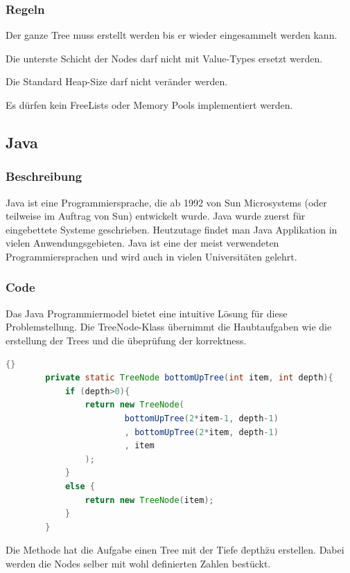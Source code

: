 \documentclass{fancydocument}
\begin{document}
\subsubsection{Regeln}

\item Der ganze Tree muss erstellt werden bis er wieder eingesammelt
  werden kann.
\item Die unterste Schicht der Nodes darf nicht mit Value-Types
  ersetzt werden.
\item Die Standard Heap-Size darf nicht ver\"ander werden.
\item Es d\"urfen kein FreeLists oder Memory Pools implementiert werden.


\subsection{Java}
\subsubsection{Beschreibung}

Java ist eine Programmiersprache, die ab 1992 von Sun Microsystems (oder
teilweise im Auftrag von Sun) entwickelt wurde. Java wurde zuerst f\"ur
eingebettete Systeme geschrieben. Heutzutage findet man Java Applikation in
vielen Anwendungsgebieten.
Java ist eine der meist verwendeten Programmiersprachen und wird auch
in vielen Universitäten gelehrt. 

\subsubsection{Code}

Das Java Programmiermodel bietet eine  intuitive L\"osung f\"ur diese
Problemstellung. Die TreeNode-Klass \"ubernimmt die Haubtaufgaben wie
die erstellung der Trees und die \"ubepr\"ufung der korrektness.
\\
\begin{lstlisting}[language=java,caption=Tree erstelung]{}
		private static TreeNode bottomUpTree(int item, int depth){
			if (depth>0){
				return new TreeNode(
						bottomUpTree(2*item-1, depth-1)
						, bottomUpTree(2*item, depth-1)
						, item
				);
			}
			else {
				return new TreeNode(item);
			}
		}
\end{lstlisting}
		
Die Methode hat die Aufgabe einen Tree mit der Tiefe \"depth\" zu
erstellen. Dabei werden die Nodes selber mit wohl definierten Zahlen best\"uckt. 
\end{document}
